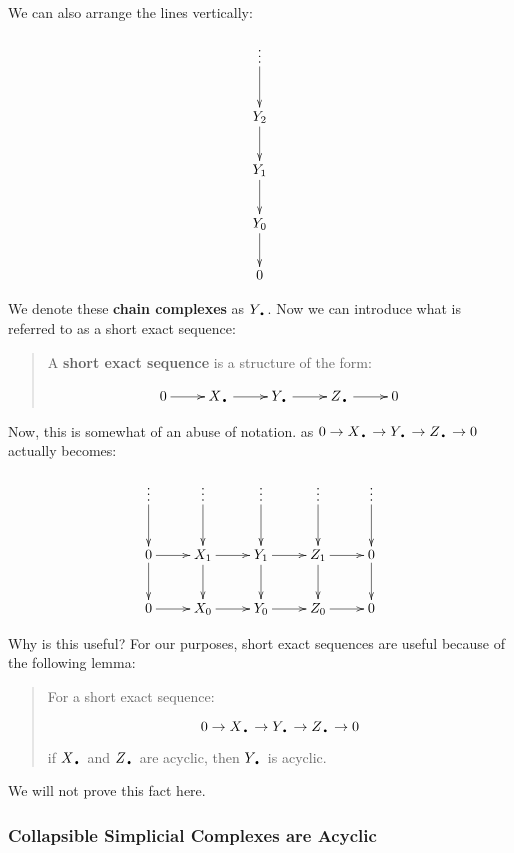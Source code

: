 \documentclass[letterpaper,12pt]{article}
\newcommand{\tb}{\text{\textbullet}}
\begin{document}
We can also arrange the lines vertically:

\begin{displaymath}
    \xymatrix{\vdots \ar[d] \\ Y_2 \ar[d] \\ Y_1 \ar[d] \\ Y_0 \ar[d] \\ 0 }
\end{displaymath}

We denote these \textbf{chain complexes} as $Y_{\tb}$. Now we can introduce what is referred to as a short exact sequence:

\begin{quote}
    A \textbf{short exact sequence} is a structure of the form:

    \begin{displaymath}
        \xymatrix{0 \ar[r] & X_{\tb} \ar[r] & Y_{\tb} \ar[r] & Z_{\tb} \ar[r] & 0 }
    \end{displaymath}

\end{quote}

Now, this is somewhat of an abuse of notation. as $0 \rightarrow X_{\tb} \rightarrow Y_{\tb} \rightarrow Z_{\tb} \rightarrow 0$ actually becomes:

\begin{displaymath}
    \xymatrix{ \vdots \ar[d] & \vdots \ar[d] & \vdots \ar[d] & \vdots \ar[d] & \vdots \ar[d] \\  
              0 \ar[r] \ar[d] & X_{1} \ar[r] \ar[d] & Y_{1} \ar[r] \ar[d] & Z_{1} \ar[r] \ar[d] & 0 \ar[d]  \\
              0 \ar[r]        & X_{0} \ar[r]        & Y_{0} \ar[r]        & Z_{0} \ar[r] &        0 \\ }
\end{displaymath}

Why is this useful? For our purposes, short exact sequences are useful because of the following lemma:

\begin{quote}
    For a short exact sequence:

    $$0 \rightarrow X_{\tb} \rightarrow Y_{\tb} \rightarrow Z_{\tb} \rightarrow 0 $$

    if $X_{\tb}$ and $Z_{\tb}$ are acyclic, then $Y_{\tb}$ is acyclic.
\end{quote}

We will not prove this fact here.

\subsubsection{Collapsible Simplicial Complexes are Acyclic}
\end{document}
